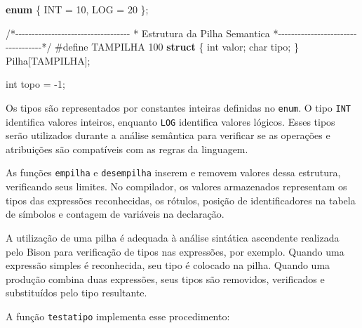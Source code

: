 \documentclass[
  brazilian,
  letterpaper,
]{book}
\newenvironment{Shaded}{\begin{snugshade}}{\end{snugshade}}
\newcommand{\CommentTok}[1]{\textcolor[rgb]{0.37,0.37,0.37}{#1}}
\newcommand{\DataTypeTok}[1]{\textcolor[rgb]{0.68,0.00,0.00}{#1}}
\newcommand{\DecValTok}[1]{\textcolor[rgb]{0.68,0.00,0.00}{#1}}
\newcommand{\KeywordTok}[1]{\textcolor[rgb]{0.00,0.23,0.31}{\textbf{#1}}}
\newcommand{\NormalTok}[1]{\textcolor[rgb]{0.00,0.23,0.31}{#1}}
\newcommand{\OperatorTok}[1]{\textcolor[rgb]{0.37,0.37,0.37}{#1}}
\newcommand{\PreprocessorTok}[1]{\textcolor[rgb]{0.68,0.00,0.00}{#1}}
\theoremstyle{plain}
\theoremstyle{definition}
\theoremstyle{remark}
\begin{document}
\begin{Shaded}
\begin{Highlighting}[]
\KeywordTok{enum}
\OperatorTok{\{}
\NormalTok{    INT }\OperatorTok{=} \DecValTok{10}\OperatorTok{,}
\NormalTok{    LOG }\OperatorTok{=} \DecValTok{20}
\OperatorTok{\};}

\CommentTok{/*{-}{-}{-}{-}{-}{-}{-}{-}{-}{-}{-}{-}{-}{-}{-}{-}{-}{-}{-}{-}{-}{-}{-}{-}{-}{-}{-}{-}{-}{-}{-}{-}{-}{-}{-}}
\CommentTok{ * Estrutura da Pilha Semantica}
\CommentTok{ *{-}{-}{-}{-}{-}{-}{-}{-}{-}{-}{-}{-}{-}{-}{-}{-}{-}{-}{-}{-}{-}{-}{-}{-}{-}{-}{-}{-}{-}{-}{-}{-}{-}{-}{-}*/}
\PreprocessorTok{\#define TAMPILHA }\DecValTok{100}
\KeywordTok{struct}
\OperatorTok{\{}
    \DataTypeTok{int}\NormalTok{ valor}\OperatorTok{;}
    \DataTypeTok{char}\NormalTok{ tipo}\OperatorTok{;}
\OperatorTok{\}}\NormalTok{ Pilha}\OperatorTok{[}\NormalTok{TAMPILHA}\OperatorTok{];}

\DataTypeTok{int}\NormalTok{ topo }\OperatorTok{=} \OperatorTok{{-}}\DecValTok{1}\OperatorTok{;}
\end{Highlighting}
\end{Shaded}

Os tipos são representados por constantes inteiras definidas no
\texttt{enum}. O tipo \texttt{INT} identifica valores inteiros, enquanto
\texttt{LOG} identifica valores lógicos. Esses tipos serão utilizados
durante a análise semântica para verificar se as operações e atribuições
são compatíveis com as regras da linguagem.

As funções \texttt{empilha} e \texttt{desempilha} inserem e removem
valores dessa estrutura, verificando seus limites. No compilador, os
valores armazenados representam os tipos das expressões reconhecidas, os
rótulos, posição de identificadores na tabela de símbolos e contagem de
variáveis na declaração.

A utilização de uma pilha é adequada à análise sintática ascendente
realizada pelo Bison para verificação de tipos nas expressões, por
exemplo. Quando uma expressão simples é reconhecida, seu tipo é colocado
na pilha. Quando uma produção combina duas expressões, seus tipos são
removidos, verificados e substituídos pelo tipo resultante.

A função \texttt{testatipo} implementa esse procedimento:
\end{document}
